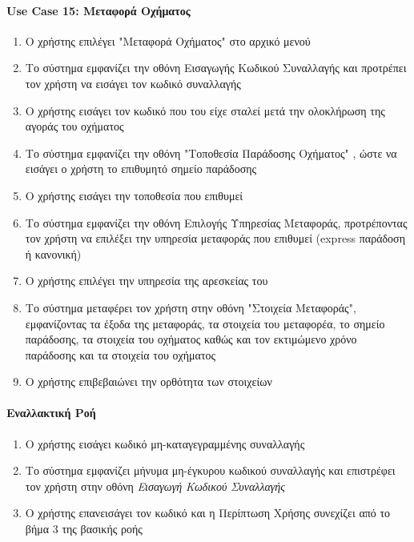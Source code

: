 \documentclass{../ol-softwaremanual}
\begin{document}
	\paragraph{\en Use Case 15: \gr Μεταφορά Οχήματος}  
	\begin{enumerate}
		\item Ο χρήστης επιλέγει \en"\gr Μεταφορά Οχήματος\en" \gr στο αρχικό μενού
		\item Το σύστημα εμφανίζει την οθόνη Εισαγωγής Κωδικού Συναλλαγής και προτρέπει τον χρήστη να εισάγει τον κωδικό συναλλαγής
		\item Ο χρήστης εισάγει τον κωδικό που του είχε σταλεί μετά την ολοκλήρωση της αγοράς του οχήματος
		\item Το σύστημα εμφανίζει την οθόνη \en"\gr Τοποθεσία Παράδοσης Οχήματος\en" \gr, ώστε να εισάγει ο χρήστη το επιθυμητό σημείο παράδοσης
		\item Ο χρήστης εισάγει την τοποθεσία που επιθυμεί
		\item Το σύστημα εμφανίζει την οθόνη Επιλογής Υπηρεσίας Μεταφοράς, προτρέποντας τον χρήστη να επιλέξει την υπηρεσία μεταφοράς που επιθυμεί (\en express \gr παράδοση ή κανονική)		
		\item Ο χρήστης επιλέγει την υπηρεσία της αρεσκείας του
		\item Το σύστημα μεταφέρει τον χρήστη στην οθόνη \en"\gr Στοιχεία Μεταφοράς\en"\gr, εμφανίζοντας τα έξοδα της μεταφοράς, τα στοιχεία του μεταφορέα, το σημείο παράδοσης, τα στοιχεία του οχήματος καθώς και τον εκτιμώμενο χρόνο παράδοσης και τα στοιχεία του οχήματος
		\item Ο χρήστης επιβεβαιώνει την ορθότητα των στοιχείων 
	\end{enumerate}
	
	\paragraph{Εναλλακτική Ροή}
	\begin{enumerate}
		\item Ο χρήστης εισάγει κωδικό μη-καταγεγραμμένης συναλλαγής
		\item Το σύστημα εμφανίζει μήνυμα μη-έγκυρου κωδικού συναλλαγής και επιστρέφει τον χρήστη στην οθόνη \textit{Εισαγωγή Κωδικού Συναλλαγής} 
		\item Ο χρήστης επανεισάγει τον κωδικό και η Περίπτωση Χρήσης συνεχίζει από το βήμα 3 της βασικής ροής
	\end{enumerate}
	
\end{document}

